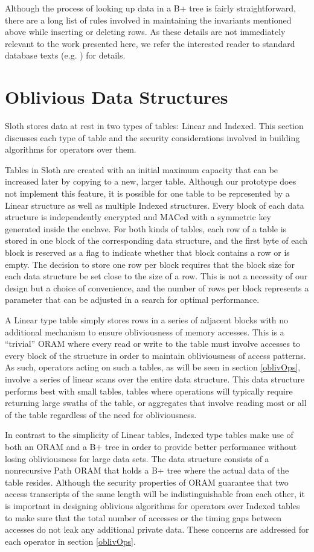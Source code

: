 \documentclass[USenglish,oneside,twocolumn]{article}
\def\name/{Sloth}
\begin{document}
Although the process of looking up data in a B+ tree is fairly straightforward, there are a long list of rules involved in maintaining the invariants mentioned above while inserting or deleting rows. As these details are not immediately relevant to the work presented here, we refer the interested reader to standard database texts (e.g. \cite{EN10}) for details. 

\section{Oblivious Data Structures}\label{oblivData}
\name/ stores data at rest in two types of tables: Linear and Indexed. This section discusses each type of table and the security considerations involved in building algorithms for operators over them. 

Tables in \name/ are created with an initial maximum capacity that can be increased later by copying to a new, larger table. Although our prototype does not implement this feature, it is possible for one table to be represented by a Linear structure as well as multiple Indexed structures. Every block of each data structure is independently encrypted and MACed with a symmetric key generated inside the enclave. For both kinds of tables, each row of a table is stored in one block of the corresponding data structure, and the first byte of each block is reserved as a flag to indicate whether that block contains a row or is empty. The decision to store one row per block requires that the block size for each data structure be set close to the size of a row. This is not a necessity of our design but a choice of convenience, and the number of rows per block represents a parameter that can be adjusted in a search for optimal performance.

A Linear type table simply stores rows in a series of adjacent blocks with no additional mechanism to ensure obliviousness of memory accesses. This is a ``trivial'' ORAM where every read or write to the table must involve accesses to every block of the structure in order to maintain obliviousness of access patterns. As such, operators acting on such a tables, as will be seen in section \ref{oblivOps}, involve a series of linear scans over the entire data structure. This data structure performs best with small tables, tables where operations will typically require returning large swaths of the table, or aggregates that involve reading most or all of the table regardless of the need for obliviousness.

In contrast to the simplicity of Linear tables, Indexed type tables make use of both an ORAM and a B+ tree in order to provide better performance without losing obliviousness for large data sets. The data structure consists of a nonrecursive Path ORAM that holds a B+ tree where the actual data of the table resides. Although the security properties of ORAM guarantee that two access transcripts of the same length will be indistinguishable from each other, it is important in designing oblivious algorithms for operators over Indexed tables to make sure that the total number of accesses or the timing gaps between accesses do not leak any additional private data. These concerns are addressed for each operator in section \ref{oblivOps}. 
\end{document}
